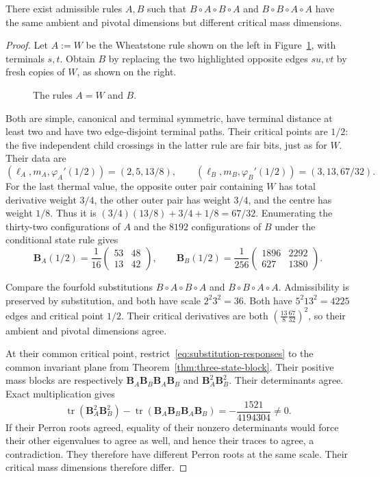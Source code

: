 \begin{lemma}\label{lem:permutation-obstruction}
There exist admissible rules $A,B$ such that $B\circ A\circ B\circ A$ and $B\circ B\circ A\circ A$ have the same ambient and pivotal dimensions but different critical mass dimensions.
\end{lemma}
\begin{proof}
Let $A:=W$ be the Wheatstone rule shown on the left in Figure~\ref{fig:wheatstone-permutation-rules}, with terminals $s,t$.
Obtain $B$ by replacing the two highlighted opposite edges $su,vt$ by fresh copies of $W$, as shown on the right.
\begin{figure}[tbp]
\centering

\caption{The rules $A=W$ and $B$.}
\label{fig:wheatstone-permutation-rules}
\end{figure}
Both are simple, canonical and terminal symmetric, have terminal distance at least two and have two edge-disjoint terminal paths. Their critical points are $1/2$: the five independent child crossings in the latter rule are fair bits, just as for $W$. Their data are
\[
 (\ell_A,m_A,\varphi_A'(1/2))=(2,5,13/8),\qquad
 (\ell_B,m_B,\varphi_B'(1/2))=(3,13,67/32).
\]
For the last thermal value, the opposite outer pair containing $W$ has total derivative weight $3/4$, the other outer pair has weight $3/4$, and the centre has weight $1/8$. Thus it is $(3/4)(13/8)+3/4+1/8=67/32$.
Enumerating the thirty-two configurations of $A$ and the $8192$ configurations of $B$ under the conditional state rule gives
\[
 \mathbf B_A(1/2)=\frac1{16}\begin{pmatrix}53&48\\13&42\end{pmatrix},
 \qquad
 \mathbf B_B(1/2)=\frac1{256}\begin{pmatrix}1896&2292\\627&1380\end{pmatrix}.
\]

Compare the fourfold substitutions $B\circ A\circ B\circ A$ and $B\circ B\circ A\circ A$. Admissibility is preserved by substitution, and both have scale $2^2 3^2=36$. Both have $5^2 13^2=4225$ edges and critical point $1/2$.
Their critical derivatives are both $(\frac{13}{8}\frac{67}{32})^2$, so their ambient and pivotal dimensions agree.

At their common critical point, restrict~\eqref{eq:substitution-responses} to the common invariant plane from Theorem~\ref{thm:three-state-block}.
Their positive mass blocks are respectively $\mathbf B_A\mathbf B_B\mathbf B_A\mathbf B_B$ and $\mathbf B_A^2\mathbf B_B^2$. Their determinants agree. Exact multiplication gives
\[
 \operatorname{tr}(\mathbf B_A^2\mathbf B_B^2)
 -\operatorname{tr}(\mathbf B_A\mathbf B_B\mathbf B_A\mathbf B_B)
 =-\frac{1521}{4194304}\ne0.
\]
If their Perron roots agreed, equality of their nonzero determinants would force their other eigenvalues to agree as well, and hence their traces to agree, a contradiction. They therefore have different Perron roots at the same scale. Their critical mass dimensions therefore differ.
\end{proof}
